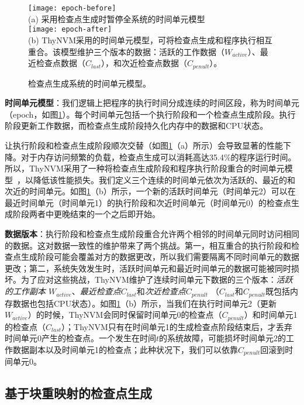 \begin{figure}[!h]
\centering
\texttt{[image: epoch-before]}\\
{\small (a) 采用检查点生成时暂停全系统的时间单元模型}\\
\vspace{10pt}
\texttt{[image: epoch-after]}\\
{\small (b) ThyNVM采用的时间单元模型，可将检查点生成和程序执行相互重合。该模型维护三个版本的数据：活跃的工作数据（$W_{active}$）、最近检查点数据（$C_{last}$），和次近检查点数据（$C_{penult}$）。\hfill}
\caption{检查点生成系统的时间单元模型。}
\label{fig-epoch}
\end{figure}

\textbf{时间单元模型}：我们逻辑上把程序的执行时间分成连续的时间区段，称为时间单元（epoch，如图\ref{fig-epoch}）。每个时间单元包括一个执行阶段和一个检查点生成阶段。执行阶段更新工作数据，而检查点生成阶段持久化内存中的数据和CPU状态。

让执行阶段和检查点生成阶段顺次交替（如图\ref{fig-epoch}（a）所示）会导致显著的性能下降。对于内存访问频繁的负载，检查点生成可以消耗高达35.4\%的程序运行时间。所以，ThyNVM采用了一种将检查点生成阶段和程序执行阶段重合的时间单元模型~\cite{1003568}，以降低该性能损失。我们定义三个连续的时间单元依次为活跃的、最近的和次近的时间单元。如图\ref{fig-epoch}（b）所示，一个新的活跃时间单元（时间单元2）可以在最近时间单元（时间单元1）的执行阶段和次近时间单元（时间单元0）的检查点生成阶段两者中更晚结束的一个之后即开始。

\textbf{数据版本}：执行阶段和检查点生成阶段重合允许两个相邻的时间单元同时访问相同的数据。这对数据一致性的维护带来了两个挑战。第一，相互重合的执行阶段和检查点生成阶段可能会覆盖对方的数据更改，所以我们需要隔离不同时间单元的数据更改；第二，系统失效发生时，活跃时间单元和最近时间单元的数据可能被同时损坏。为了应对这些挑战，ThyNVM维护了连续时间单元下数据的三个版本：\emph{活跃的工作副本 $W_{active}$}、\emph{最近检查点$C_{last}$}和\emph{次近检查点$C_{penult}$} （$C_{last}$和$C_{penult}$既包括内存数据也包括CPU状态）。如图\ref{fig-epoch}（b）所示，当我们在执行时间单元2（更新$W_{active}$）的时候，ThyNVM会同时保留时间单元0的检查点（$C_{penult}$）和时间单元1的检查点（$C_{last}$）；ThyNVM只有在时间单元1的生成检查点阶段结束后，才丢弃时间单元0产生的检查点。一个发生在时间$t$的系统故障，可能损坏时间单元2的工作数据副本以及时间单元1的检查点；此种状况下，我们可以依靠$C_{penult}$回滚到时间单元0。

\subsection{基于块重映射的检查点生成}
\label{subsec:block-remap}

